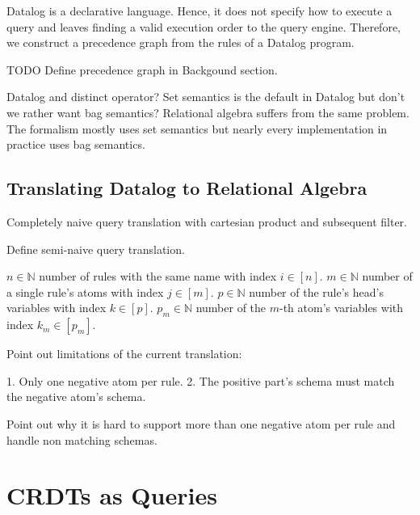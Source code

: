 Datalog is a declarative language. Hence, it does not specify how to execute
a query and leaves finding a valid execution order to the query engine.
Therefore, we construct a precedence graph from the rules of a Datalog program.

TODO Define precedence graph in Backgound section.

Datalog and distinct operator? Set semantics is the default in Datalog but don't
we rather want bag semantics? Relational algebra suffers from the same problem.
The formalism mostly uses set semantics but nearly every implementation in
practice uses bag semantics.

\subsection{Translating Datalog to Relational Algebra}\label{sec:datalog-to-relational-algebra}


Completely naive query translation with cartesian product and subsequent filter.

Define semi-naive query translation.

\(n \in \mathbb{N}\) number of rules with the same name with index \(i \in [n]\).
\(m \in \mathbb{N}\) number of a single rule's atoms with index \(j \in [m]\).
\(p \in \mathbb{N}\) number of the rule's head's variables with index \(k \in [p]\).
\(p_m \in \mathbb{N}\) number of the \(m\)-th atom's variables with index \(k_m \in [p_m]\).

Point out limitations of the current translation:

1. Only one negative atom per rule.
2. The positive part's schema must match the negative atom's schema.

Point out why it is hard to support more than one negative atom per rule
and handle non matching schemas.



\section{\acp{CRDT} as Queries}\label{sec:crdts-as-queries}
